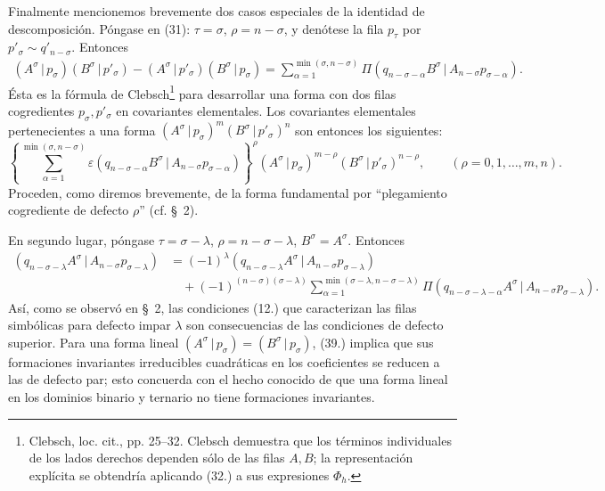 \documentclass[11pt]{article}
\newcommand{\pair}[2]{(#1\,|\,#2)}
\newcommand{\eps}{\varepsilon}
\begin{document}
Finalmente mencionemos brevemente dos casos especiales de la identidad de descomposición. Póngase en (31): $\tau=\sigma$, $\rho=n-\sigma$, y denótese la fila $p_\tau$ por $p'_\sigma\sim q'_{n-\sigma}$. Entonces
\begin{equation}
\begin{aligned}
\pair{A^\sigma}{p_\sigma}\pair{B^\sigma}{p'_\sigma}
-\pair{A^\sigma}{p'_\sigma}\pair{B^\sigma}{p_\sigma}
=\sum_{\alpha=1}^{\min(\sigma,n-\sigma)}
\Pi\pair{q_{n-\sigma-\alpha}B^\sigma}{A_{n-\sigma}p_{\sigma-\alpha}}.
\end{aligned}
\tag{37}
\end{equation}
Ésta es la fórmula de Clebsch\footnote{Clebsch, loc. cit., pp. 25--32. Clebsch demuestra que los términos individuales de los lados derechos dependen sólo de las filas $A,B$; la representación explícita se obtendría aplicando (32.) a sus expresiones $\Phi_h$.} para desarrollar una forma con dos filas cogredientes $p_\sigma,p'_\sigma$ en covariantes elementales. Los covariantes elementales pertenecientes a una forma $\pair{A^\sigma}{p_\sigma}^m\pair{B^\sigma}{p'_\sigma}^n$ son entonces los siguientes:
\begin{equation}
 \left\{\sum_{\alpha=1}^{\min(\sigma,n-\sigma)}
 \eps\pair{q_{n-\sigma-\alpha}B^\sigma}{A_{n-\sigma}p_{\sigma-\alpha}}
 \right\}^{\rho}
 \pair{A^\sigma}{p_\sigma}^{m-\rho}\pair{B^\sigma}{p'_\sigma}^{n-\rho},
 \qquad (\rho=0,1,\ldots,m,n).
\tag{38}
\end{equation}
Proceden, como diremos brevemente, de la forma fundamental por ``plegamiento cogrediente de defecto $\rho$'' (cf. \S\ 2).

En segundo lugar, póngase $\tau=\sigma-\lambda$, $\rho=n-\sigma-\lambda$, $B^\sigma=A^\sigma$. Entonces
\begin{equation}
\begin{aligned}
\pair{q_{n-\sigma-\lambda}A^\sigma}{A_{n-\sigma}p_{\sigma-\lambda}}
&=(-1)^\lambda\pair{q_{n-\sigma-\lambda}A^\sigma}{A_{n-\sigma}p_{\sigma-\lambda}}\\
&\quad+(-1)^{(n-\sigma)(\sigma-\lambda)}
 \sum_{\alpha=1}^{\min(\sigma-\lambda,n-\sigma-\lambda)}
 \Pi\pair{q_{n-\sigma-\lambda-\alpha}A^\sigma}{A_{n-\sigma}p_{\sigma-\lambda}}.
\end{aligned}
\tag{39}
\end{equation}
Así, como se observó en \S\ 2, las condiciones (12.) que caracterizan las filas simbólicas para defecto impar $\lambda$ son consecuencias de las condiciones de defecto superior. Para una forma lineal $\pair{A^\sigma}{p_\sigma}=\pair{B^\sigma}{p_\sigma}$, (39.) implica que sus formaciones invariantes irreducibles cuadráticas en los coeficientes se reducen a las de defecto par; esto concuerda con el hecho conocido de que una forma lineal en los dominios binario y ternario no tiene formaciones invariantes.
\end{document}
